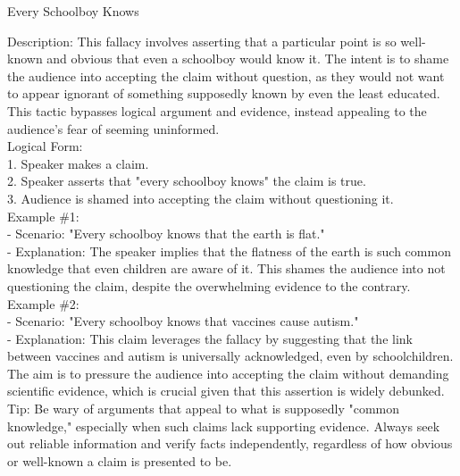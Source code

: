 \documentclass[a4paper,12pt,single,pdftex]{scrbook}
\begin{document}
Every Schoolboy Knows
    
      Description: This fallacy involves asserting that a particular point is so well-known and obvious that even a schoolboy would know it. The intent is to shame the audience into accepting the claim without question, as they would not want to appear ignorant of something supposedly known by even the least educated. This tactic bypasses logical argument and evidence, instead appealing to the audience's fear of seeming uninformed.
    \\

    
      Logical Form:
    \\

    
        1. Speaker makes a claim.
    \\

    
        2. Speaker asserts that "every schoolboy knows" the claim is true.
    \\

    
        3. Audience is shamed into accepting the claim without questioning it.
    \\

    
      Example \#1:
    \\

    
        - Scenario: "Every schoolboy knows that the earth is flat."
    \\

    
        - Explanation: The speaker implies that the flatness of the earth is such common knowledge that even children are aware of it. This shames the audience into not questioning the claim, despite the overwhelming evidence to the contrary.
    \\

    
      Example \#2:
    \\

    
        - Scenario: "Every schoolboy knows that vaccines cause autism."
    \\

    
        - Explanation: This claim leverages the fallacy by suggesting that the link between vaccines and autism is universally acknowledged, even by schoolchildren. The aim is to pressure the audience into accepting the claim without demanding scientific evidence, which is crucial given that this assertion is widely debunked.
    \\

    
      Tip: Be wary of arguments that appeal to what is supposedly "common knowledge," especially when such claims lack supporting evidence. Always seek out reliable information and verify facts independently, regardless of how obvious or well-known a claim is presented to be.
    \\
\end{document}
